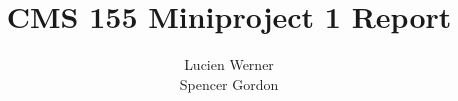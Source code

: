 







\title{CMS 155 Miniproject 1 Report} 
\author{Lucien Werner\\Spencer Gordon} 








\thispagestyle{empty} %
\maketitle



